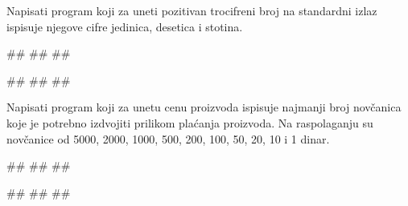 

\begin{Exercise}[label=v1.1_05] 
Napisati program koji za uneti pozitivan trocifreni broj na standardni izlaz ispisuje njegove cifre jedinica, desetica i stotina. 

\begin{miditest}
\begin{upotreba}{1}
#\naslovInt#
##
##
\end{upotreba}
\end{miditest}
\begin{miditest}
\begin{upotreba}{2}
#\naslovInt#
##
##
\end{upotreba}
\end{miditest}
\end{Exercise}
\ifresenja
\begin{Answer}[ref=v1.1_05]
\end{Answer}
\fi

\begin{Exercise}[label=v1.1_08] 
Napisati program koji za unetu cenu proizvoda ispisuje najmanji broj novčanica koje je potrebno izdvojiti prilikom plaćanja proizvoda. Na raspolaganju su novčanice od 5000, 2000, 1000, 500, 200, 100, 50, 20, 10 i 1 dinar. 

\begin{maxitest}
\begin{upotreba}{1}
#\naslovInt#
##
##
\end{upotreba}
\begin{upotreba}{2}
#\naslovInt#
##
##
\end{upotreba}
\end{maxitest}
\end{Exercise}
\ifresenja
\begin{Answer}[ref=v1.1_08]
\end{Answer}
\fi

